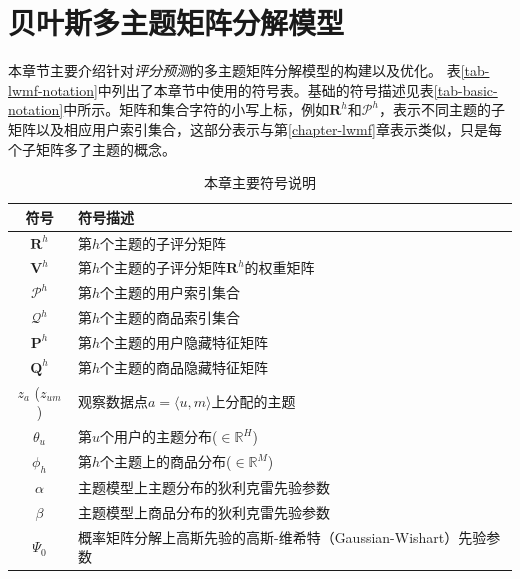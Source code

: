 		
		

\section{贝叶斯多主题矩阵分解模型}
\label{sec-bpmtmf-model}
本章节主要介绍针对\textit{评分预测}的多主题矩阵分解模型的构建以及优化。 表\ref{tab-lwmf-notation}中列出了本章节中使用的符号表。基础的符号描述见表\ref{tab-basic-notation}中所示。矩阵和集合字符的小写上标，例如$\mathbf{R}^h$和$\mathcal{P}^h$，表示不同主题的子矩阵以及相应用户索引集合，这部分表示与第\ref{chapter-lwmf}章表示类似，只是每个子矩阵多了主题的概念。

\begin{table}
	\centering
	\caption{本章主要符号说明}
	\label{tab-bpmtmf-notation}%
	\begin{small}
		\begin{tabular}{cp{}}
			\hline
			符号 & 符号描述 \bigstrut\\
			\hline\hline
			$\mathbf{R}^h$ & 第$h$个主题的子评分矩阵 \bigstrut\\
			$ \mathbf{V}^h$ & 第$h$个主题的子评分矩阵$\mathbf{R}^h$的权重矩阵\bigstrut\\
			$ \mathcal{P}^h$ & 第$h$个主题的用户索引集合  \bigstrut\\
			$ \mathcal{Q}^h$ & 第$h$个主题的商品索引集合  \bigstrut\\
			$ \mathbf{P}^h$  & 第$h$个主题的用户隐藏特征矩阵 \bigstrut\\
			$\mathbf{Q}^h$  &  第$h$个主题的商品隐藏特征矩阵 \bigstrut\\
			\hline
			$z_a$ ($z_{um}$)    &观察数据点$a=\langle u,m\rangle$上分配的主题\bigstrut \\
			$\theta_u$ & 第$u$个用户的主题分布($\in \mathbb{R}^H$) \bigstrut\\
			$\phi_h$ & 第$h$个主题上的商品分布($\in \mathbb{R}^M$) \bigstrut\\
			\hline
			$\alpha$ &主题模型上主题分布的狄利克雷先验参数\bigstrut \\
			$\beta$ &  主题模型上商品分布的狄利克雷先验参数\bigstrut\\
			$\Psi_0$ & 概率矩阵分解上高斯先验的高斯-维希特（Gaussian-Wishart）先验参数 \bigstrut\\
			\hline
		\end{tabular}%
	\end{small}
\end{table}%

